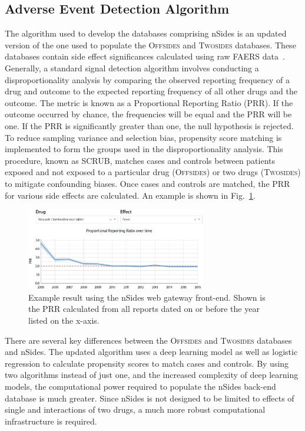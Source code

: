 \documentclass{ws-procs11x85}
\begin{document}
\subsection{Adverse Event Detection Algorithm}
The algorithm used to develop the databases comprising nSides is an
updated version of the one used to populate the O\textsc{ffsides} and
T\textsc{wosides} databases.  These databases contain side effect
significances calculated using raw FAERS data~\cite{Tatonetti2012}.
Generally, a standard signal detection algorithm involves conducting a
disproportionality analysis by comparing the observed reporting
frequency of a drug and outcome to the expected reporting frequency of
all other drugs and the outcome. The metric is known as a Proportional
Reporting Ratio (PRR). If the outcome occurred by chance, the
frequencies will be equal and the PRR will be one. If the PRR is
significantly greater than one, the null hypothesis is rejected. To
reduce sampling variance and selection bias, propensity score matching
is implemented to form the groups used in the disproportionality
analysis. This procedure, known as SCRUB, matches cases and controls
between patients exposed and not exposed to a particular drug
(O\textsc{ffsides}) or two drugs (T\textsc{wosides}) to mitigate
confounding biases. Once cases and controls are matched, the PRR for
various side effects are calculated. An example is shown in
Fig.~\ref{fig:prr}.

\begin{figure}[h]
\centerline{\includegraphics[width=0.7\textwidth]{prr}}
\caption{Example result using the nSides web gateway front-end. Shown
  is the PRR calculated from all reports dated on or before the year listed on the
  x-axis.}
\label{fig:prr}
\end{figure}

There are several key differences between the O\textsc{ffsides} and
T\textsc{wosides} databases and nSides. The updated algorithm uses a
deep learning model as well as logistic regression to calculate
propensity scores to match cases and controls. By using two algorithms
instead of just one, and the increased complexity of deep learning
models, the computational power required to populate the nSides
back-end database is much greater. Since nSides is not designed to be
limited to effects of single and interactions of two drugs, a much
more robust computational infrastructure is required.
\end{document}
